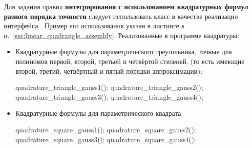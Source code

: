 Для задания правил {\bf интегрирования с использованием квадратурных формул разного порядка точности} следует
использовать класс  в качестве реализации
интерфейса . Пример его использования
указан в листинге к п.~\ref{sec:linear_quadrangle_assembly}.
Реализованные в программе квадратуры:
\begin{itemize}
\item Квадратурные формулы для параметрического треугольника, точные для полиномов первой, второй, третьей и четвёртой степеней.
(то есть имеющие второй, третий, четвёртный и пятый порядки аппроксимации):
\begin{cppcode}
quadrature_triangle_gauss1();
quadrature_triangle_gauss2();
quadrature_triangle_gauss3();
quadrature_triangle_gauss4();
\end{cppcode}
\item Квадратурные формулы для параметрического квадрата
\begin{cppcode}
quadrature_square_gauss1();
quadrature_square_gauss2();
quadrature_square_gauss3();
quadrature_square_gauss4();
\end{cppcode}
\end{itemize}

